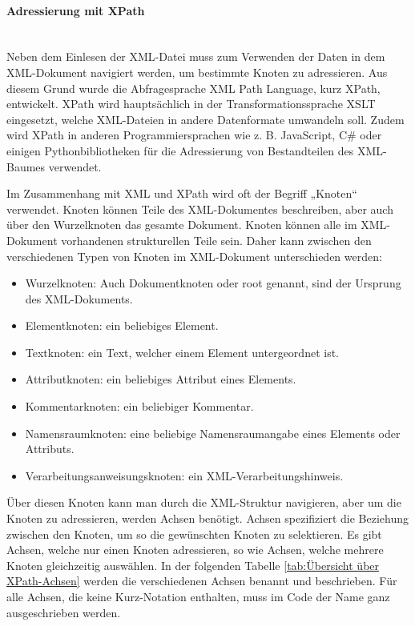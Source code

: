 \paragraph{Adressierung mit XPath}\mbox{}\\

Neben dem Einlesen der \ac{XML}-Datei muss zum Verwenden der Daten in dem \ac{XML}-Dokument navigiert werden, um bestimmte Knoten zu adressieren.
Aus diesem Grund wurde die Abfragesprache XML Path Language, kurz XPath, entwickelt.
XPath wird hauptsächlich in der Transformationssprache \ac{XSLT} eingesetzt, welche \ac{XML}-Dateien in andere Datenformate umwandeln soll.
Zudem wird XPath in anderen Programmiersprachen wie z. B. JavaScript, C# oder einigen Pythonbibliotheken für die Adressierung von Bestandteilen des \ac{XML}-Baumes verwendet.

Im Zusammenhang mit \ac{XML} und XPath wird oft der Begriff „Knoten“ verwendet.
Knoten können Teile des \ac{XML}-Dokumentes beschreiben, aber auch über den Wurzelknoten das gesamte Dokument.
Knoten können alle im \ac{XML}-Dokument vorhandenen strukturellen Teile sein.
Daher kann zwischen den verschiedenen Typen von Knoten im \ac{XML}-Dokument unterschieden werden:

\begin{itemize}
\item Wurzelknoten: Auch Dokumentknoten oder root genannt, sind der Ursprung des \ac{XML}-Dokuments.
\item Elementknoten: ein beliebiges Element.
\item Textknoten: ein Text, welcher einem Element untergeordnet ist.
\item Attributknoten: ein beliebiges Attribut eines Elements.
\item Kommentarknoten: ein beliebiger Kommentar.
\item Namensraumknoten: eine beliebige Namensraumangabe eines Elements oder Attributs.
\item Verarbeitungsanweisungsknoten: ein XML-Verarbeitungshinweis.
\end{itemize}

Über diesen Knoten kann man durch die \ac{XML}-Struktur navigieren, aber um die Knoten zu adressieren, werden Achsen benötigt.
Achsen spezifiziert die Beziehung zwischen den Knoten, um so die gewünschten Knoten zu selektieren.
Es gibt Achsen, welche nur einen Knoten adressieren, so wie Achsen, welche mehrere Knoten gleichzeitig auswählen.
In der folgenden Tabelle \ref{tab:Übersicht über XPath-Achsen} werden die verschiedenen Achsen benannt und beschrieben.
Für alle Achsen, die keine Kurz-Notation enthalten, muss im Code der Name ganz ausgeschrieben werden. \cite*{XPath2025}

